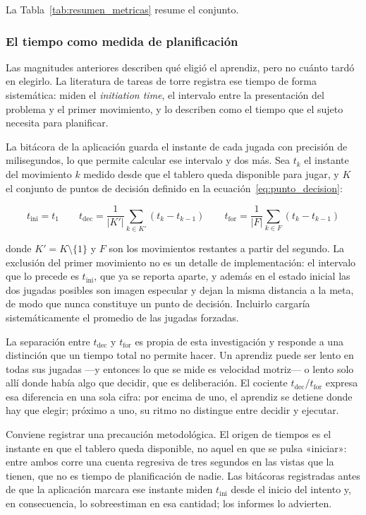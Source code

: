 \documentclass{book}
\begin{document}
La Tabla~\ref{tab:resumen_metricas} resume el conjunto.


\subsubsection*{El tiempo como medida de planificación}

Las magnitudes anteriores describen qué eligió el aprendiz, pero no
cuánto tardó en elegirlo. La literatura de tareas de torre registra
ese tiempo de forma sistemática: \citet{HinzFaber2009} miden el
\textit{initiation time}, el intervalo entre la presentación del
problema y el primer movimiento, y lo describen como el tiempo que
el sujeto necesita para planificar.

La bitácora de la aplicación guarda el instante de cada jugada con
precisión de milisegundos, lo que permite calcular ese intervalo y
dos más. Sea $t_k$ el instante del movimiento $k$ medido desde que
el tablero queda disponible para jugar, y $K$ el conjunto de puntos
de decisión definido en la ecuación~\ref{eq:punto_decision}:

\begin{equation}
    t_{\mathrm{ini}} = t_1
    \qquad
    t_{\mathrm{dec}} = \frac{1}{|K'|}\sum_{k \in K'} (t_k - t_{k-1})
    \qquad
    t_{\mathrm{for}} = \frac{1}{|F|}\sum_{k \in F} (t_k - t_{k-1})
    \label{eq:tiempos}
\end{equation}

donde $K' = K \setminus \{1\}$ y $F$ son los movimientos restantes a
partir del segundo. La exclusión del primer movimiento no es un
detalle de implementación: el intervalo que lo precede es
$t_{\mathrm{ini}}$, que ya se reporta aparte, y además en el estado
inicial las dos jugadas posibles son imagen especular y dejan la
misma distancia a la meta, de modo que nunca constituye un punto de
decisión. Incluirlo cargaría sistemáticamente el promedio de las
jugadas forzadas.

La separación entre $t_{\mathrm{dec}}$ y $t_{\mathrm{for}}$ es propia
de esta investigación y responde a una distinción que un tiempo
total no permite hacer. Un aprendiz puede ser lento en todas sus
jugadas —y entonces lo que se mide es velocidad motriz— o lento
solo allí donde había algo que decidir, que es deliberación. El
cociente $t_{\mathrm{dec}} / t_{\mathrm{for}}$ expresa esa diferencia
en una sola cifra: por encima de uno, el aprendiz se detiene donde
hay que elegir; próximo a uno, su ritmo no distingue entre decidir y
ejecutar.

Conviene registrar una precaución metodológica. El origen de
tiempos es el instante en que el tablero queda disponible, no aquel
en que se pulsa «iniciar»: entre ambos corre una cuenta regresiva
de tres segundos en las vistas que la tienen, que no es tiempo de
planificación de nadie. Las bitácoras registradas antes de que la
aplicación marcara ese instante miden $t_{\mathrm{ini}}$ desde el
inicio del intento y, en consecuencia, lo sobreestiman en esa
cantidad; los informes lo advierten.
\end{document}
